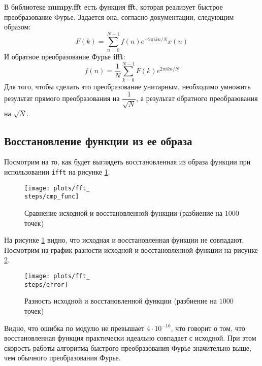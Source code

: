 В библиотеке \textbf{numpy.fft} есть функция \textbf{fft}, которая реализует быстрое преобразование Фурье. Задается она, согласно документации, следующим образом:
\begin{equation}
    F(k) = \sum_{n=0}^{N-1} f(n) e^{-2\pi i k n / N} x(n)
\end{equation}
И обратное преобразование Фурье \textbf{ifft}:
\begin{equation}
    f(n) = \frac{1}{N} \sum_{k=0}^{N-1} F(k) e^{2\pi i k n / N}
\end{equation}
Для того, чтобы сделать это преобразование унитарным, необходимо 
умножить результат прямого преобразования на $\dfrac{1}{\sqrt{N}}$, а результат обратного преобразования на $\sqrt{N}$.

\subsection{Восстановление функции из ее образа}
\def\steps{1000}
Посмотрим на то, как будет выглядеть восстановленная из образа функции при использовании \texttt{ifft} на рисунке \ref{fig:\steps_ifft_cmp}.
\begin{figure}[ht!]
    \centering
    \texttt{[image: plots/fft\_\\steps/cmp\_func]}
    \caption{Сравнение исходной и восстановленной функции (разбиение на $\steps$ точек)}
    \label{fig:\steps_ifft_cmp}
\end{figure}

На рисунке \ref{fig:\steps_ifft_cmp} видно, что исходная и восстановленная функции не совпадают. 
Посмотрим на график разности исходной и восстановленной функции на рисунке \ref{fig:\steps_ifft_error}.
\begin{figure}[ht!]
    \centering
    \texttt{[image: plots/fft\_\\steps/error]}
    \caption{Разность исходной и восстановленной функции (разбиение на $\steps$ точек)}
    \label{fig:\steps_ifft_error}
\end{figure}

Видно, что ошибка по модулю не превышает $4 \cdot 10^{-16}$, что говорит о том, что восстановленная функция практически идеально совпадает с исходной.
При этом скорость работы алгоритма быстрого преобразования Фурье значительно выше, чем обычного преобразования Фурье.

